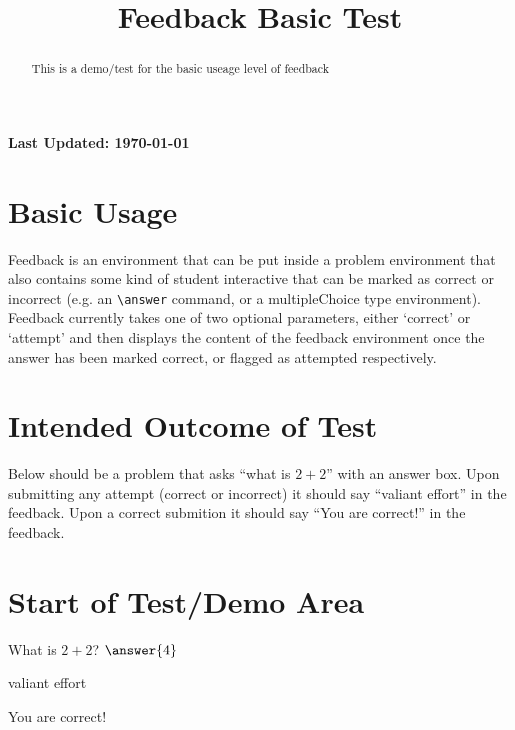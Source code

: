 \documentclass{ximera}
\title{Feedback Basic Test}
\begin{document}
\begin{abstract}
    This is a demo/test for the basic useage level of feedback
\end{abstract}
\maketitle

{{\Huge \bfseries Last Updated: \today}} \\

\section{Basic Usage}
Feedback is an environment that can be put inside a problem environment that also contains some kind of student interactive that can be marked as
correct or incorrect (e.g. an \verb|\answer| command, or a multipleChoice type environment).\\

Feedback currently takes one of two optional parameters, either `correct' or `attempt' and then displays the content of the feedback environment
once the answer has been marked correct, or flagged as attempted respectively.

\section{Intended Outcome of Test}

Below should be a problem that asks ``what is $2 + 2$'' with an answer box. 
Upon submitting any attempt (correct or incorrect) it should say ``valiant effort'' in the feedback.
Upon a correct submition it should say ``You are correct!'' in the feedback.

\section{Start of Test/Demo Area}
\begin{problem}
    What is $2+2$? $\answer{4}$
    \begin{feedback}
        valiant effort
    \end{feedback}
    \begin{feedback}[correct]
        You are correct!
    \end{feedback}
\end{problem}

\hrulefill
\end{document}
